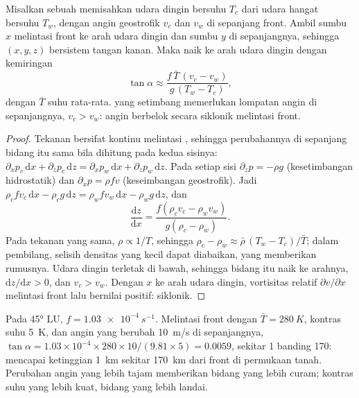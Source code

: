 \begin{proposition}\label{prop:b2:weather-systems:slope}
Misalkan sebuah  memisahkan udara dingin bersuhu $T_c$ dari udara hangat bersuhu $T_w$, dengan
angin geostrofik $v_c$ dan $v_w$ di sepanjang front. Ambil sumbu $x$ melintasi front ke arah
udara dingin dan sumbu $y$ di sepanjangnya, sehingga $(x, y, z)$ bersistem tangan kanan. Maka  naik ke arah udara dingin dengan kemiringan
\[
  \tan\alpha \approx \frac{f\,\bar T\,(v_c - v_w)}{g\,(T_w - T_c)},
\]
dengan $\bar T$ suhu rata-rata.  yang setimbang memerlukan lompatan angin
di sepanjangnya, $v_c > v_w$: angin berbelok secara siklonik melintasi front.
\end{proposition}

\begin{proof}
Tekanan bersifat kontinu melintasi , sehingga perubahannya di sepanjang bidang itu
sama bila dihitung pada kedua sisinya: $\partial_x p_c\,\mathrm{d}x + \partial_z p_c\,\mathrm{d}z =
\partial_x p_w\,\mathrm{d}x + \partial_z p_w\,\mathrm{d}z$. Pada setiap sisi $\partial_z p = -\rho g$
(kesetimbangan hidrostatik) dan $\partial_x p = \rho f v$ (keseimbangan geostrofik). Jadi
$\rho_c f v_c\,\mathrm{d}x - \rho_c g\,\mathrm{d}z = \rho_w f v_w\,\mathrm{d}x - \rho_w
g\,\mathrm{d}z$, dan
\[
  \frac{\mathrm{d}z}{\mathrm{d}x} = \frac{f(\rho_c v_c - \rho_w v_w)}{g(\rho_c - \rho_w)} .
\]
Pada tekanan yang sama, $\rho \propto 1/T$, sehingga $\rho_c - \rho_w \approx \bar\rho\,(T_w -
T_c)/\bar T$; dalam pembilang, selisih densitas yang kecil dapat diabaikan, yang
memberikan rumusnya. Udara dingin terletak di bawah, sehingga bidang itu naik ke arahnya, $\mathrm{d}z/
\mathrm{d}x > 0$, dan $v_c > v_w$. Dengan $x$ ke arah udara dingin, vortisitas relatif
$\partial v/\partial x$ melintasi front lalu bernilai positif: siklonik.
\end{proof}

\begin{example}\label{ex:b2:weather-systems:slope}
Pada \ang{45} LU, $f = \qty{1.03e-4}{s^{-1}}$. Melintasi front dengan $\bar T = \qty{280}{K}$,
kontras suhu \qty{5}{K}, dan angin yang berubah \qty{10}{m/s} di sepanjangnya, $\tan\alpha
= 1.03 \times 10^{-4} \times 280 \times 10/(9.81 \times 5) = 0.0059$, sekitar 1 banding 170:  mencapai ketinggian \qty{1}{km} sekitar \qty{170}{km} dari front di permukaan tanah.
Perubahan angin yang lebih tajam memberikan bidang yang lebih curam; kontras suhu yang lebih kuat, bidang yang lebih landai.
\end{example}


